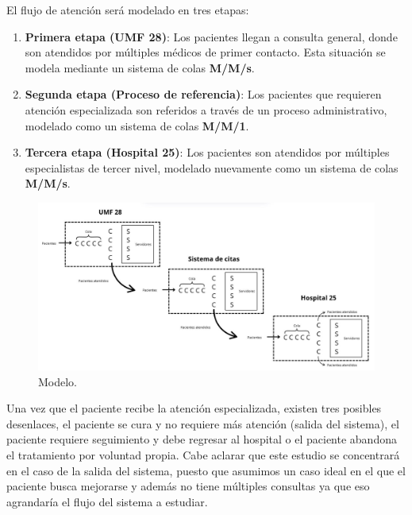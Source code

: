 \documentclass[10pt]{article}
\begin{document}
    El flujo de atención será modelado en tres etapas:

    \begin{enumerate}
        \item \textbf{Primera etapa (UMF 28)}: Los pacientes llegan a consulta general, donde son atendidos por múltiples médicos de primer contacto. Esta situación se modela mediante un sistema de colas \textbf{M/M/s}.
        
        \item \textbf{Segunda etapa (Proceso de referencia)}: Los pacientes que requieren atención especializada son referidos a través de un proceso administrativo, modelado como un sistema de colas \textbf{M/M/1}.
        
        \item \textbf{Tercera etapa (Hospital 25)}: Los pacientes son atendidos por múltiples especialistas de tercer nivel, modelado nuevamente como un sistema de colas \textbf{M/M/s}.
    \end{enumerate}

    \begin{figure}[h]
		\centering
		\includegraphics[width=130mm]{./images/sistema.jpg}
		\caption{Modelo.}
	\end{figure}

    Una vez que el paciente recibe la atención especializada, existen tres posibles desenlaces, el paciente se cura y no requiere más atención (salida del sistema), el paciente requiere seguimiento y debe regresar al hospital o el paciente abandona el tratamiento por voluntad propia. Cabe aclarar que este estudio se concentrará en el caso de la salida del sistema, puesto que asumimos un caso ideal en el que el paciente busca mejorarse y además no tiene múltiples consultas ya que eso agrandaría el flujo del sistema a estudiar.
\end{document}
